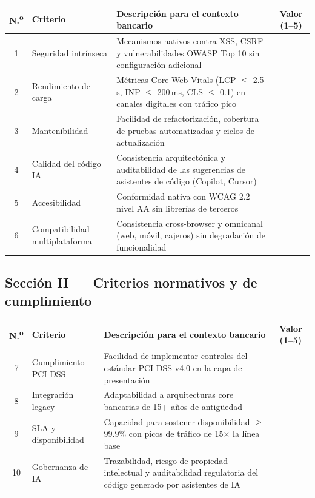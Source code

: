 \begin{center}
\small
\begin{tabular}{@{}cp{2.8cm}p{8cm}c@{}}
\toprule
N.\textsuperscript{o} & Criterio & Descripción para el contexto bancario & Valor (1--5) \\
\midrule
1 & Seguridad intrínseca & Mecanismos nativos contra XSS, CSRF y vulnerabilidades OWASP Top 10 sin configuración adicional & \\
2 & Rendimiento de carga & Métricas Core Web Vitals (LCP $\leq$ 2.5\,s, INP $\leq$ 200\,ms, CLS $\leq$ 0.1) en canales digitales con tráfico pico & \\
3 & Mantenibilidad & Facilidad de refactorización, cobertura de pruebas automatizadas y ciclos de actualización & \\
4 & Calidad del código IA & Consistencia arquitectónica y auditabilidad de las sugerencias de asistentes de código (Copilot, Cursor) & \\
5 & Accesibilidad & Conformidad nativa con WCAG 2.2 nivel AA sin librerías de terceros & \\
6 & Compatibilidad multiplataforma & Consistencia cross-browser y omnicanal (web, móvil, cajeros) sin degradación de funcionalidad & \\
\bottomrule
\end{tabular}
\end{center}

\subsection*{Sección II --- Criterios normativos y de cumplimiento}

\begin{center}
\small
\begin{tabular}{@{}cp{2.8cm}p{8cm}c@{}}
\toprule
N.\textsuperscript{o} & Criterio & Descripción para el contexto bancario & Valor (1--5) \\
\midrule
7 & Cumplimiento PCI-DSS & Facilidad de implementar controles del estándar PCI-DSS v4.0 en la capa de presentación & \\
8 & Integración legacy & Adaptabilidad a arquitecturas core bancarias de 15+ años de antigüedad & \\
9 & SLA y disponibilidad & Capacidad para sostener disponibilidad $\geq$ 99.9\% con picos de tráfico de 15$\times$ la línea base & \\
10 & Gobernanza de IA & Trazabilidad, riesgo de propiedad intelectual y auditabilidad regulatoria del código generado por asistentes de IA & \\
\bottomrule
\end{tabular}
\end{center}

